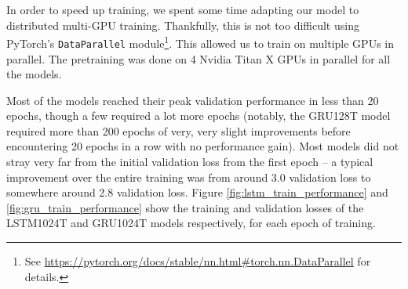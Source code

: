 \documentclass[a4paper,12pt]{article}
\begin{document}
In order to speed up training, we spent some time adapting our model to distributed multi-GPU training. Thankfully, this is not too difficult using PyTorch's \texttt{DataParallel} module\footnote{See \url{https://pytorch.org/docs/stable/nn.html\#torch.nn.DataParallel} for details.}. This allowed us to train on multiple GPUs in parallel. The pretraining was done on 4 Nvidia Titan X GPUs in parallel for all the models.

Most of the models reached their peak validation performance in less than 20 epochs, though a few required a lot more epochs (notably, the GRU128T model required more than 200 epochs of very, very slight improvements before encountering 20 epochs in a row with no performance gain). Most models did not stray very far from the initial validation loss from the first epoch -- a typical improvement over the entire training was from around 3.0 validation loss to somewhere around 2.8 validation loss. Figure \ref{fig:lstm_train_performance} and \ref{fig:gru_train_performance} show the training and validation losses of the LSTM1024T and GRU1024T models respectively, for each epoch of training.
\end{document}
